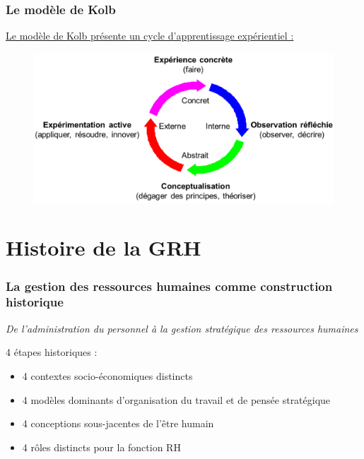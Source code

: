 \documentclass[12pt]{beamer}
\begin{document}
  \begin{frame}
    \frametitle{Le modèle de Kolb}
	\underline{Le modèle de Kolb présente un cycle d'apprentissage expérientiel :}
	
	\begin{figure}[!ht]
	    \begin{center}
		\includegraphics[scale=0.25]{modele_de_kolb.png}
	    \end{center}
	\end{figure}
  \end{frame}

\section{Histoire de la GRH}
  \begin{frame}
      \frametitle{La gestion des ressources humaines comme construction historique}
      \textit{De l'administration du personnel à la gestion stratégique des ressources humaines}
      \bigskip
      
      4 étapes historiques :
      
      \begin{itemize}
       \item 4 contextes socio-économiques distincts
       \item 4 modèles dominants d'organisation du travail et de pensée stratégique
       \item 4 conceptions sous-jacentes de l'être humain
       \item 4 rôles distincts pour la fonction RH
      \end{itemize}
      
  \end{frame}
  
\end{document}
